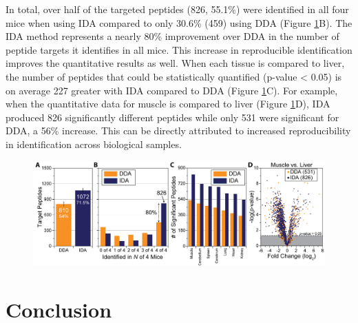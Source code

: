 In total, over half of the targeted peptides (826, 55.1\%) were identified in all four mice when using IDA compared to only 30.6\% (459) using DDA (Figure \ref{fig:eoa7}B). The IDA method represents a nearly 80\% improvement over DDA in the number of peptide targets it identifies in all mice. This increase in reproducible identification improves the quantitative results as well. When each tissue is compared to liver, the number of peptides that could be statistically quantified (p-value < 0.05) is on average 227 greater with IDA compared to DDA (Figure \ref{fig:eoa7}C). For example, when the quantitative data for muscle is compared to liver (Figure \ref{fig:eoa7}D), IDA produced 826 significantly different peptides while only 531 were significant for DDA, a 56\% increase. This can be directly attributed to increased reproducibility in identification across biological samples.
\begin{figure}
	\centering
	\includegraphics[width=\columnwidth]{eoa/EOA 7.png}
	\label{fig:eoa7}
\end{figure}

\section{Conclusion}

